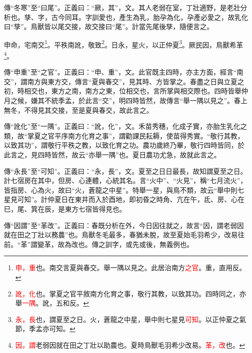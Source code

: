 {\noindent\zhuan{}\fzbyks 傳“冬寒”至“曰尾”。正義曰：“厥，其”，文。其人老弱在室，丁壯適野，是老壯分析也。孳、字，古今同耳。字訓愛也，產生為乳，胎孕為化，孕產必愛之，故乳化曰“孳”。鳥獸皆以尾交接，故交接曰“尾”。計當先尾後孳，隨便言之。 \par}

申命，宅南交\footnote{\textcolor{red}{申，重}也。南交言夏與春交。舉一隅以見之。此居治南方\textcolor{red}{之官}。重，直用反。}。平秩南訛，敬致\footnote{\textcolor{red}{訛，化}也。掌夏之官平敘南方化育之事，敬行其教，以致其功。四時同之，亦舉\textcolor{red}{一隅}。訛，五和反。}。日永，星火，以正仲夏\footnote{\textcolor{red}{永，長}也，謂夏至之日。火，蒼龍之中星，舉中則七星見\textcolor{red}{可知}。以正仲夏之氣節，季孟亦可知。}。厥民因，鳥獸希革\footnote{\textcolor{red}{因，謂}老弱因就在田之丁壯以助農也。夏時鳥獸毛羽希少改易。\textcolor{red}{革，改}也。}。

{\noindent\zhuan{}\fzbyks 傳“申重”至“之官”。正義曰：“申、重”，文。此官既主四時，亦主方面，經言“南交”，謂南方與東方交，傳言“夏與春交”，見其時、方皆掌之。春盡之日與立夏之初，時相交也，東方之南，南方之東，位相交也，言所掌與相交際也。四時皆舉仲月之候，嫌其不統季孟，於此言“交”，明四時皆然，故傳言“舉一隅以見之”。春上無冬，不得見其交接，至是夏與春交，故此言之。 \par}

{\noindent\zhuan{}\fzbyks 傳“訛化”至“一隅”。正義曰：“訛，化”，文。禾苗秀穗，化成子實，亦胎生乳化之類，故“掌夏之官平序南方化育之事”，謂勸課民耘耨，使苗得秀實。“敬行其教，以致其功”，謂敬行平秩之教，以致化育之功。農功歲終乃畢，敬行四時皆同，於此言之，見四時皆然，故云“亦舉一隅”也。夏日農功尤急，故就此言之。 \par}

{\noindent\zhuan{}\fzbyks 傳“永長”至“可知”。正義曰：“永，長”，文。夏至之日日最長，故知謂夏至之日。計七宿房在其中，但房、心連體，心統其名。言“火中”、“火見”，稱“七月流火”，皆指房、心為火，故曰“火，蒼龍之中星”。特舉一星，與鳥不類，故云“舉中則七星見可知”。計仲夏日在東井而入於酉地，即初昏之時角、亢在午，氐、房、心在巳，尾、箕在辰，是東方七宿皆得見也。 \par}

{\noindent\zhuan{}\fzbyks 傳“因謂”至“革改”。正義曰：春既分析在外，今日因往就之，故言“因，謂老弱因就在田之丁壯以務農”也。鳥獸冬毛最多，春猶未脫，故至夏始毛羽希少，改易往前。“革”謂變革，故為改也。傳之訓字，或先或後，無義例也。 \par}

